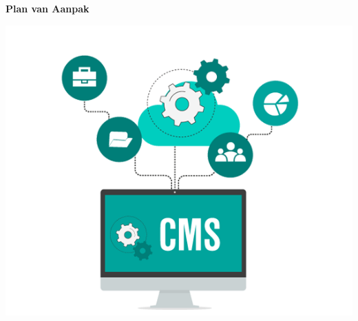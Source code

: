 \begin{titlepage}
   \begin{center}
       \vspace*{1cm}

		\Huge
		\textbf{Plan van Aanpak}

		\vspace{0.5cm}
	
		\LARGE
		\ProjectName
            
		\vspace{1.5cm}

		\textbf{\StudentName}

		\vspace{3.0cm}
		
		\includegraphics[width=1\textwidth]{img/cmsheader.png}
   \end{center}
\end{titlepage}
